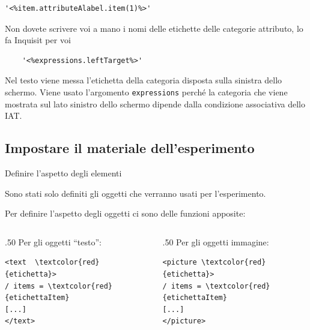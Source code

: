 \documentclass{beamer}
\begin{document}
\begin{frame}[fragile]
	\begin{Verbatim}
'<%item.attributeAlabel.item(1)%>' 
	\end{Verbatim}

Non dovete scrivere voi a mano i nomi delle etichette delle categorie attributo, lo fa Inquisit per voi

\begin{verbatim}
	'<%expressions.leftTarget%>'
\end{verbatim}

Nel testo viene messa l'etichetta della categoria disposta sulla sinistra dello schermo. Viene usato l'argomento \texttt{expressions} perché la categoria che viene mostrata sul lato sinistro dello schermo dipende dalla condizione associativa dello IAT.

\end{frame}


%

\subsection*{Impostare il materiale dell'esperimento}

\begin{frame}[fragile]{Definire l'aspetto degli elementi}

Sono stati solo definiti gli oggetti che verranno usati per l'esperimento.

Per definire l'aspetto degli oggetti ci sono delle funzioni apposite: 

\vspace{3mm}
\begin{columns}
\begin{column}{.50\linewidth}
	Per gli oggetti ``testo'':
	\begin{Verbatim}[commandchars=\\\{\}]
<text  \textcolor{red}{etichetta}>
/ items = \textcolor{red}{etichettaItem}
[...]
</text>
	\end{Verbatim}
\end{column}
\begin{column}{.50\linewidth}
	Per gli oggetti immagine:
		\begin{Verbatim}[commandchars=\\\{\}]
<picture \textcolor{red}{etichetta}>
/ items = \textcolor{red}{etichettaItem}
[...]
</picture>		
	\end{Verbatim}
\end{column}
\end{columns}
\end{frame}
\end{document}
